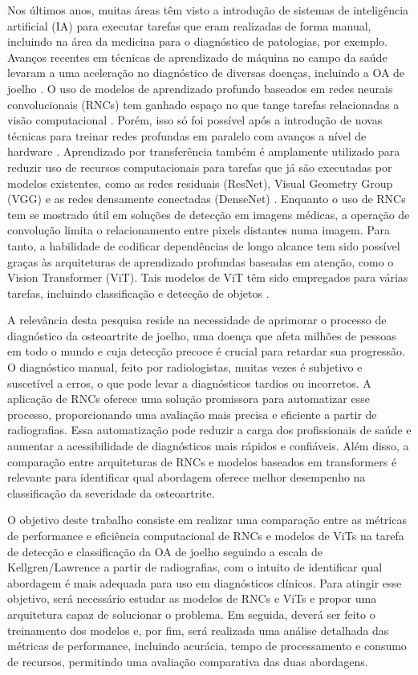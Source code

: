Nos últimos anos, muitas áreas têm visto a introdução de sistemas de inteligência artificial (IA) para executar tarefas que eram realizadas de forma manual, incluindo na área da medicina para o diagnóstico de patologias, por exemplo. Avanços recentes em técnicas de aprendizado de máquina no campo da saúde levaram a uma aceleração no diagnóstico de diversas doenças, incluindo a OA de joelho \cite{Mohammed2023}. O uso de modelos de aprendizado profundo baseados em redes neurais convolucionais (RNCs) tem ganhado espaço no que tange tarefas relacionadas a visão computacional \cite{Tariq2023}. Porém, isso só foi possível após a introdução de novas técnicas para treinar redes profundas em paralelo com avanços a nível de hardware \cite{Litjens2017}. Aprendizado por transferência também é amplamente utilizado para reduzir uso de recursos computacionais para tarefas que já são executadas por modelos existentes, como as redes residuais (ResNet), Visual Geometry Group (VGG) e as redes densamente conectadas (DenseNet) \cite{Tariq2023}. Enquanto o uso de RNCs tem se mostrado útil em soluções de detecção em imagens médicas, a operação de convolução limita o relacionamento entre pixels distantes numa imagem. Para tanto, a habilidade de codificar dependências de longo alcance tem sido possível graças às arquiteturas de aprendizado profundas baseadas em atenção, como o Vision Transformer (ViT). Tais modelos de ViT têm sido empregados para várias tarefas, incluindo classificação e detecção de objetos \cite{Shamshad2023}.

A relevância desta pesquisa reside na necessidade de aprimorar o processo de diagnóstico da osteoartrite de joelho, uma doença que afeta milhões de pessoas em todo o mundo e cuja detecção precoce é crucial para retardar sua progressão. O diagnóstico manual, feito por radiologistas, muitas vezes é subjetivo e suscetível a erros, o que pode levar a diagnósticos tardios ou incorretos. A aplicação de RNCs oferece uma solução promissora para automatizar esse processo, proporcionando uma avaliação mais precisa e eficiente a partir de radiografias. Essa automatização pode reduzir a carga dos profissionais de saúde e aumentar a acessibilidade de diagnósticos mais rápidos e confiáveis. Além disso, a comparação entre arquiteturas de RNCs e modelos baseados em transformers é relevante para identificar qual abordagem oferece melhor desempenho na classificação da severidade da osteoartrite.

O objetivo deste trabalho consiste em realizar uma comparação entre as métricas de performance e eficiência computacional de RNCs e modelos de ViTs na tarefa de detecção e classificação da OA de joelho seguindo a escala de Kellgren/Lawrence a partir de radiografias, com o intuito de identificar qual abordagem é mais adequada para uso em diagnósticos clínicos. Para atingir esse objetivo, será necessário estudar as modelos de RNCs e ViTs e propor uma arquitetura capaz de solucionar o problema. Em seguida, deverá ser feito o treinamento dos modelos e, por fim, será realizada uma análise detalhada das métricas de performance, incluindo acurácia, tempo de processamento e consumo de recursos, permitindo uma avaliação comparativa das duas abordagens.


